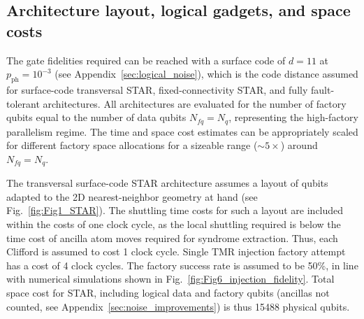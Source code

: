 \documentclass[aps, prx, reprint, superscriptaddress, longbibliography, floatfix]{revtex4-2}
\begin{document}
\subsection{Architecture layout, logical gadgets, and space costs}
\label{sec:estimate_gadgets}

The gate fidelities required can be reached with a surface code of $d=11$ at $p_{\mathrm{ph}}=10^{-3}$ (see Appendix~\ref{sec:logical_noise}), which is the code distance assumed for surface-code transversal STAR, fixed-connectivity STAR, and fully fault-tolerant architectures. All architectures are evaluated for the number of factory qubits equal to the number of data qubits $N_{fq}=N_q$, representing the high-factory parallelism regime. The time and space cost estimates can be appropriately scaled for different factory space allocations for a sizeable range ($\sim 5 \times$) around $N_{fq}=N_q$.

The transversal surface-code STAR architecture assumes a layout of qubits adapted to the 2D nearest-neighbor geometry at hand (see Fig.~\ref{fig:Fig1_STAR}). The shuttling time costs for such a layout are included within the costs of one clock cycle, as the local shuttling required is below the time cost of ancilla atom moves required for syndrome extraction. Thus, each Clifford is assumed to cost 1 clock cycle. Single TMR injection factory attempt has a cost of 4 clock cycles. The factory success rate is assumed to be 50\%, in line with numerical simulations shown in Fig.~\ref{fig:Fig6_injection_fidelity}. Total space cost for STAR, including logical data and factory qubits (ancillas not counted, see Appendix~\ref{sec:noise_improvements}) is thus 15488 physical qubits.
\end{document}
